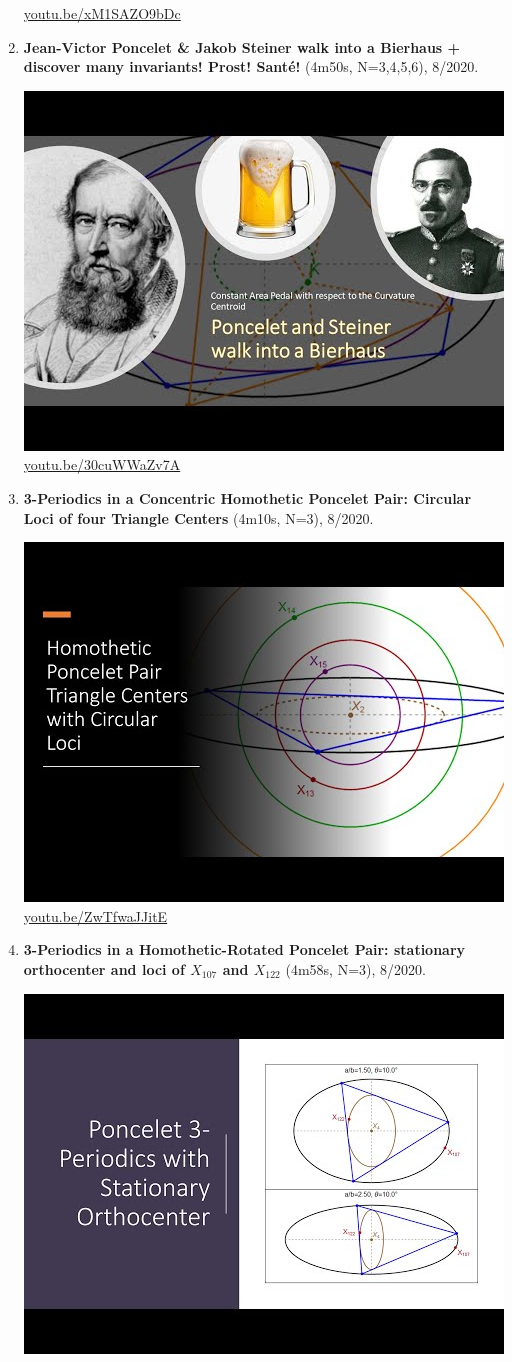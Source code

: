 \documentclass[12pt]{amsart}
\begin{document}
\begin{enumerate}[resume]
\begin{center}
\href{https://youtu.be/xM1SAZO9bDc}{\url{youtu.be/xM1SAZO9bDc}}\end{center}
% 
\item \textbf{Jean-Victor Poncelet \& Jakob Steiner walk into a Bierhaus + discover many invariants! Prost! Santé!} (4m50s, N=3,4,5,6), 8/2020. 
\begin{center}\includegraphics[width=.5\textwidth]{pics/30cuWWaZv7A.jpg} \\ 
\href{https://youtu.be/30cuWWaZv7A}{\url{youtu.be/30cuWWaZv7A}}\end{center}
% 
\item \textbf{3-Periodics in a Concentric Homothetic Poncelet Pair: Circular Loci of four Triangle Centers} (4m10s, N=3), 8/2020. 
\begin{center}\includegraphics[width=.5\textwidth]{pics/ZwTfwaJJitE.jpg} \\ 
\href{https://youtu.be/ZwTfwaJJitE}{\url{youtu.be/ZwTfwaJJitE}}\end{center}
% 
\item \textbf{3-Periodics in a Homothetic-Rotated Poncelet Pair: stationary orthocenter and loci of $X_{107}$ and $X_{122}$} (4m58s, N=3), 8/2020. 
\begin{center}\includegraphics[width=.5\textwidth]{pics/fpd_Zot5cKk.jpg} \\ 

\end{center}
\end{enumerate}
\end{document}
